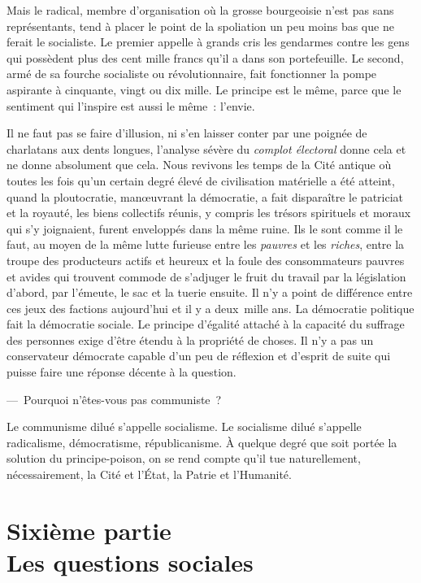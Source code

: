 \documentclass[french,twoside]{book} %
\newcommand{\astermono}{\medskip\centerline{\color{rubric}\large\selectfont{\syms ✻}}\medskip\par}%
\newcommand\chapteropen{} %
\newcommand\chapterclose{} %
\begin{document}
\astermono

\noindent Mais le radical, membre d’organisation où la grosse bourgeoisie n’est pas sans représentants, tend à placer le point de la spoliation un peu moins bas que ne ferait le socialiste. Le premier appelle à grands cris les gendarmes contre les gens qui possèdent plus des cent mille francs qu’il a dans son portefeuille. Le second, armé de sa fourche socialiste ou révolutionnaire, fait fonctionner la pompe aspirante à cinquante, vingt ou dix mille. Le principe est le même, parce que le sentiment qui l’inspire est aussi le même : l’envie.\par
Il ne faut pas se faire d’illusion, ni s’en laisser conter par une poignée de charlatans aux dents longues, l’analyse sévère du \emph{complot électoral} donne cela et ne donne absolument que cela. Nous revivons les temps de la Cité antique où toutes les fois qu’un certain degré élevé de civilisation matérielle a été atteint, quand la ploutocratie, manœuvrant la démocratie, a fait disparaître le patriciat et la royauté, les biens collectifs réunis, y compris les trésors spirituels et moraux qui s’y joignaient, furent enveloppés dans la même ruine. Ils le sont comme il le faut, au moyen de la même lutte furieuse entre les \emph{pauvres} et les \emph{riches}, entre la troupe des producteurs actifs et heureux et la foule des consommateurs pauvres et avides qui trouvent commode de s’adjuger le fruit du travail par la législation d’abord, par l’émeute, le sac et la tuerie ensuite. Il n’y a point de différence entre ces jeux des factions aujourd’hui et il y a deux mille ans. La démocratie politique fait la démocratie sociale. Le principe d’égalité attaché à la capacité du suffrage des personnes exige d’être étendu à la propriété de choses. Il n’y a pas un conservateur démocrate capable d’un peu de réflexion et d’esprit de suite qui puisse faire une réponse décente à la question.\par
— Pourquoi n’êtes-vous pas communiste ?\par
Le communisme dilué s’appelle socialisme. Le socialisme dilué s’appelle radicalisme, démocratisme, républicanisme. À quelque degré que soit portée la solution du principe-poison, on se rend compte qu’il tue naturellement, nécessairement, la Cité et l’État, la Patrie et l’Humanité.
\chapterclose


\chapteropen
\chapter[Sixième partie. Les questions sociales]{Sixième partie \\
Les questions sociales}\renewcommand{\leftmark}{Sixième partie \\
Les questions sociales}
\end{document}

